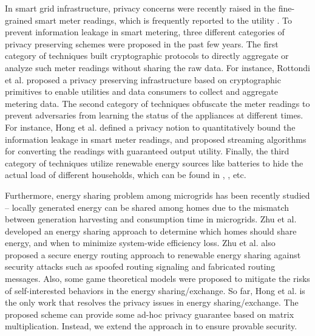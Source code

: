 In smart grid infrastructure, privacy concerns were recently raised in the fine-grained smart meter readings, which is frequently reported to the utility \cite{SankarRMP13,HongTIFS17,SGSBook}.  To prevent information leakage in smart metering, three different categories of privacy preserving schemes were proposed in the past few years. The first category of techniques built cryptographic protocols to directly aggregate or analyze such meter readings without sharing the raw data. For instance, Rottondi et al. \cite{RottondiVC13} proposed a privacy preserving infrastructure based on cryptographic primitives to enable utilities and data consumers to collect and aggregate metering data. The second category of techniques obfuscate the meter readings to prevent adversaries from learning the status of the appliances at different times. For instance, Hong et al. \cite{HongTIFS17} defined a privacy notion to quantitatively bound the information leakage in smart meter readings, and proposed streaming algorithms for converting the readings with guaranteed output utility. Finally, the third category of techniques utilize renewable energy sources like batteries to hide the actual load of different households, which can be found in \cite{McLaughlinMA11}, \cite{YangLQQMM12}, etc.

Furthermore, energy sharing problem among microgrids \cite{SaadHPB12,ZhuHSSIMMS13} has been recently studied -- locally generated energy can be shared among homes due to the mismatch between generation harvesting and consumption time in microgrids. Zhu et al. \cite{ZhuHSSIMMS13} developed an energy sharing approach to determine which homes should share energy, and when to minimize system-wide efficiency loss. Zhu et al.  \cite{ZhuXPTG11} also proposed a secure energy routing approach to renewable energy sharing against security attacks such as spoofed routing signaling and fabricated routing messages. Also, some game theoretical models \cite{SaadHPB12,MaityR10,DuanD09} were proposed to mitigate the risks of self-interested behaviors in the energy sharing/exchange. So far, Hong et al. \cite{HongIJER15} is the only work that resolves the privacy issues in energy sharing/exchange. The proposed scheme can provide some ad-hoc privacy guarantee based on matrix multiplication. Instead, we extend the approach in \cite{HongIJER15} to ensure provable security.

